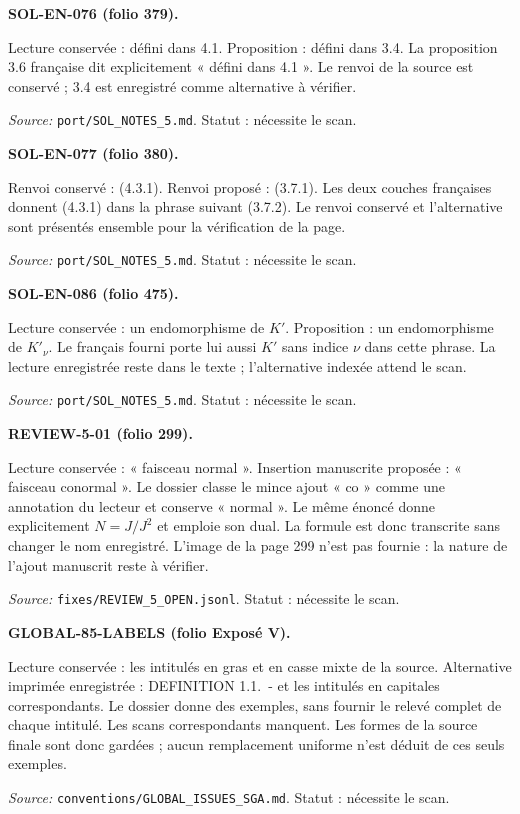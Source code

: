 \medskip\noindent\textbf{SOL-EN-076 (folio 379).}\par
Lecture conservée : défini dans 4.1. Proposition : défini dans 3.4.
La proposition 3.6 française dit explicitement « défini dans 4.1 ». Le renvoi de la source est conservé ; 3.4 est enregistré comme alternative à vérifier.
\par\noindent\textit{Source: }\texttt{port/SOL\_NOTES\_5.md}. Statut : nécessite le scan.

\medskip\noindent\textbf{SOL-EN-077 (folio 380).}\par
Renvoi conservé : (4.3.1). Renvoi proposé : (3.7.1).
Les deux couches françaises donnent (4.3.1) dans la phrase suivant (3.7.2). Le renvoi conservé et l’alternative sont présentés ensemble pour la vérification de la page.
\par\noindent\textit{Source: }\texttt{port/SOL\_NOTES\_5.md}. Statut : nécessite le scan.

\medskip\noindent\textbf{SOL-EN-086 (folio 475).}\par
Lecture conservée : un endomorphisme de $K'$. Proposition : un endomorphisme de $K'_\nu$.
Le français fourni porte lui aussi $K'$ sans indice $\nu$ dans cette phrase. La lecture enregistrée reste dans le texte ; l’alternative indexée attend le scan.
\par\noindent\textit{Source: }\texttt{port/SOL\_NOTES\_5.md}. Statut : nécessite le scan.

\medskip\noindent\textbf{REVIEW-5-01 (folio 299).}\par
Lecture conservée : « faisceau normal ». Insertion manuscrite proposée : « faisceau conormal ».
Le dossier classe le mince ajout « co » comme une annotation du lecteur et conserve « normal ». Le même énoncé donne explicitement $N=J/J^2$ et emploie son dual. La formule est donc transcrite sans changer le nom enregistré. L’image de la page 299 n’est pas fournie : la nature de l’ajout manuscrit reste à vérifier.
\par\noindent\textit{Source: }\texttt{fixes/REVIEW\_5\_OPEN.jsonl}. Statut : nécessite le scan.

\medskip\noindent\textbf{GLOBAL-85-LABELS (folio Exposé V).}\par
Lecture conservée : les intitulés en gras et en casse mixte de la source. Alternative imprimée enregistrée : DEFINITION 1.1.~- et les intitulés en capitales correspondants.
Le dossier donne des exemples, sans fournir le relevé complet de chaque intitulé. Les scans correspondants manquent. Les formes de la source finale sont donc gardées ; aucun remplacement uniforme n’est déduit de ces seuls exemples.
\par\noindent\textit{Source: }\texttt{conventions/GLOBAL\_ISSUES\_SGA.md}. Statut : nécessite le scan.

